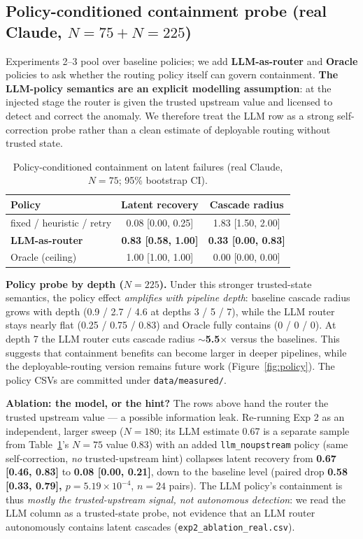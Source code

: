 \documentclass[sigconf,nonacm,anonymous]{acmart}  %
\begin{document}
\subsection{Policy-conditioned containment probe (real Claude, $N{=}75 + N{=}225$)}
\label{sec:policyprobe}
Experiments 2--3 pool over baseline policies; we add \textbf{LLM-as-router} and
\textbf{Oracle} policies to ask whether the routing policy itself can govern
containment. \textbf{The LLM-policy semantics are an explicit modelling
assumption}: at the injected stage the router is given the trusted upstream value
and licensed to detect and correct the anomaly. We therefore treat the LLM row as
a strong self-correction probe rather than a clean estimate of deployable routing
without trusted state.

\begin{table}[t]
\centering
\caption{Policy-conditioned containment on latent failures (real Claude, $N{=}75$; 95\% bootstrap CI).}
\label{tab:policy}
\small
\begin{tabular}{@{}lcc@{}}
\toprule
\textbf{Policy} & \textbf{Latent recovery} & \textbf{Cascade radius} \\
\midrule
fixed / heuristic / retry & 0.08 [0.00, 0.25] & 1.83 [1.50, 2.00] \\
\textbf{LLM-as-router} & \textbf{0.83 [0.58, 1.00]} & \textbf{0.33 [0.00, 0.83]} \\
Oracle (ceiling) & 1.00 [1.00, 1.00] & 0.00 [0.00, 0.00] \\
\bottomrule
\end{tabular}
\end{table}

\textbf{Policy probe by depth ($N{=}225$).} Under this stronger trusted-state
semantics, the policy effect \emph{amplifies with pipeline depth}: baseline
cascade radius grows with depth (0.9 / 2.7 / 4.6 at depths 3 / 5 / 7), while the
LLM router stays nearly flat (0.25 / 0.75 / 0.83) and Oracle fully contains (0 /
0 / 0). At depth 7 the LLM router cuts cascade radius
\textbf{$\sim$5.5$\times$} versus the baselines. This suggests that containment
benefits can become larger in deeper pipelines, while the deployable-routing
version remains future work (Figure~\ref{fig:policy}). The policy CSVs are
committed under \texttt{data/measured/}.

\textbf{Ablation: the model, or the hint?} The rows above hand the router the
trusted upstream value --- a possible information leak. Re-running Exp 2 as an
independent, larger sweep ($N{=}180$; its LLM estimate 0.67 is a separate sample
from Table~\ref{tab:policy}'s $N{=}75$ value 0.83) with an added
\texttt{llm\_noupstream} policy (same self-correction, \emph{no} trusted-upstream
hint) collapses latent recovery from \textbf{0.67 [0.46, 0.83]} to
\textbf{0.08 [0.00, 0.21]}, down to the baseline level (paired drop
\textbf{0.58 [0.33, 0.79], $p{=}5.19{\times}10^{-4}$}, $n{=}24$ pairs). The LLM policy's containment is thus
\emph{mostly the trusted-upstream signal, not autonomous detection}: we read the
LLM column as a trusted-state probe, not evidence that an LLM router autonomously
contains latent cascades (\texttt{exp2\_ablation\_real.csv}).
\end{document}
